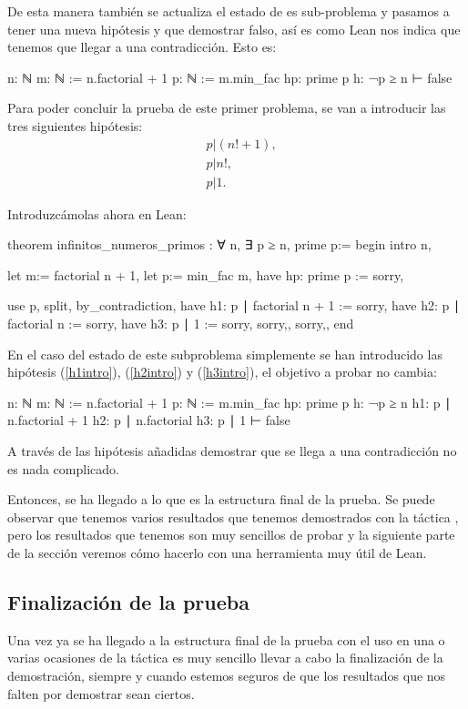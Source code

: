 De esta manera también se actualiza el estado de es sub-problema y pasamos a
tener una nueva hipótesis y que demostrar falso, así es como Lean nos indica
que tenemos que llegar a una contradicción. Esto es:
\begin{leancode}
n: ℕ
m: ℕ := n.factorial + 1
p: ℕ := m.min_fac
hp: prime p
h: ¬p ≥ n
⊢ false
\end{leancode}

Para poder concluir la prueba de este primer problema, se van a introducir
las tres siguientes hipótesis:
\begin{align}
  &p | (n!+1),\tag{h1}\label{h1intro}\\
  &p | n!, \tag{h2}\label{h2intro}\\
  &p | 1.\tag{h3}\label{h3intro}
\end{align}

Introduzcámolas ahora en Lean:
\begin{leancode}
theorem infinitos_numeros_primos : ∀ n, ∃ p ≥ n, prime p:=
begin
  intro n,

  let m:= factorial n + 1,
  let p:= min_fac m,
  have hp: prime p := sorry,

  use p,
  split,
  { by_contradiction,
    have h1: p ∣ factorial n + 1 := sorry,
    have h2: p ∣ factorial n := sorry,
    have h3: p ∣ 1 := sorry,  
    sorry,},
  {sorry,},
end
\end{leancode}

En el caso del estado de este subproblema simplemente se han introducido las
hipótesis (\ref{h1intro}), (\ref{h2intro}) y (\ref{h3intro}), el objetivo a
probar no cambia:
\begin{leancode}
n: ℕ
m: ℕ := n.factorial + 1
p: ℕ := m.min_fac
hp: prime p
h: ¬p ≥ n
h1: p ∣ n.factorial + 1
h2: p ∣ n.factorial
h3: p ∣ 1
⊢ false
\end{leancode}

A través de las hipótesis añadidas demostrar que se llega a una contradicción
no es nada complicado.

Entonces, se ha llegado a lo que es la estructura final de la prueba. Se puede
observar que tenemos varios resultados que tenemos demostrados con la táctica
, pero los resultados que tenemos son muy sencillos
de probar y la siguiente parte de la sección veremos cómo hacerlo con una
herramienta muy útil de Lean.

\subsection{Finalización de la prueba}
Una vez ya se ha llegado a la estructura final de la prueba con el uso en una
o varias ocasiones de la táctica  es muy sencillo llevar
a cabo la finalización de la demostración, siempre y cuando estemos seguros
de que los resultados que nos falten por demostrar sean ciertos.

